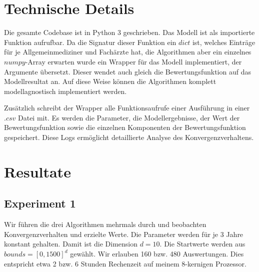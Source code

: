 \documentclass[a4paper,12pt]{article}
\begin{document}
%


\section{Technische Details}

Die gesamte Codebase ist in Python 3 geschrieben. Das Modell ist als importierte Funktion aufrufbar. Da die Signatur dieser Funktion ein $dict$ ist, welches Einträge für je Allgemeinmediziner und Fachärzte hat, die Algorithmen aber ein einzelnes $numpy$-Array erwarten wurde ein Wrapper für das Modell implementiert, der Argumente übersetzt. Dieser wendet auch gleich die Bewertungsfunktion auf das Modellresultat an. Auf diese Weise können die Algorithmen komplett modellagnostisch implementiert werden. 

Zusätzlich schreibt der Wrapper alle Funktionsaufrufe einer Ausführung in einer $.csv$ Datei mit. Es werden die Parameter, die Modellergebnisse, der Wert der Bewertungsfunktion sowie die einzelnen Komponenten der Bewertungsfunktion gespeichert. Diese Logs ermöglicht detaillierte Analyse des Konvergenzverhaltens.

\section{Resultate}

\subsection{Experiment 1}

Wir führen die drei Algorithmen mehrmals durch und beobachten Konvergenzverhalten und erzielte Werte. Die Parameter werden für je 3 Jahre konstant gehalten. Damit ist die Dimension $d = 10$. Die Startwerte werden aus $bounds = [0,1500]^d$ gewählt. Wir erlauben 160 bzw. 480 Auswertungen. Dies entspricht etwa 2 bzw. 6 Stunden Rechenzeit auf meinem 8-kernigen Prozessor.
\end{document}
